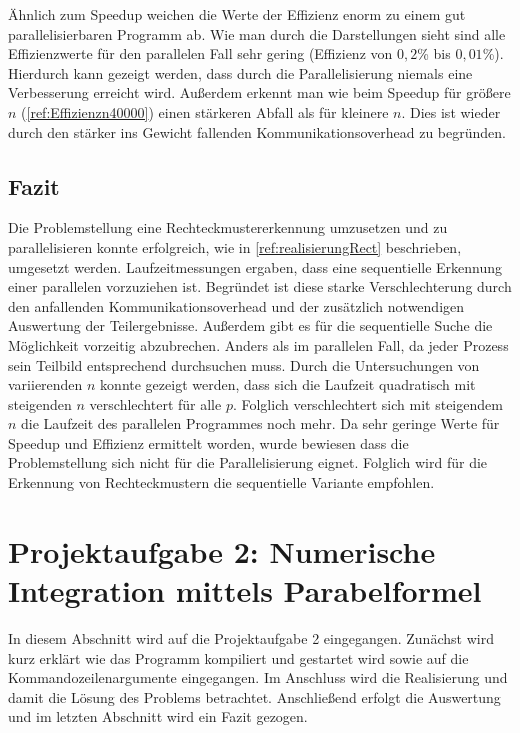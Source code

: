 Ähnlich zum Speedup weichen die Werte der Effizienz enorm zu einem gut parallelisierbaren Programm ab. 
Wie man durch die Darstellungen sieht sind alle Effizienzwerte für den parallelen Fall sehr gering (Effizienz von $0,2$\% bis $0,01$\%).
Hierdurch kann gezeigt werden, dass durch die Parallelisierung niemals eine Verbesserung erreicht wird. 
Außerdem erkennt man wie beim Speedup für größere $n$ (\autoref{ref:Effizienzn40000}) einen stärkeren Abfall als für kleinere $n$.
Dies ist wieder durch den stärker ins Gewicht fallenden Kommunikationsoverhead zu begründen.

\subsection{Fazit}
Die Problemstellung eine Rechteckmustererkennung umzusetzen und zu parallelisieren konnte erfolgreich, wie in \autoref{ref:realisierungRect} beschrieben, umgesetzt werden. 
Laufzeitmessungen ergaben, dass eine sequentielle Erkennung einer parallelen vorzuziehen ist.
Begründet ist diese starke Verschlechterung durch den anfallenden Kommunikationsoverhead und der zusätzlich notwendigen Auswertung der Teilergebnisse. 
Außerdem gibt es für die sequentielle Suche die Möglichkeit vorzeitig abzubrechen.
Anders als im parallelen Fall, da jeder Prozess sein Teilbild entsprechend durchsuchen muss.
Durch die Untersuchungen von variierenden $n$ konnte gezeigt werden, dass sich die Laufzeit quadratisch mit steigenden $n$ verschlechtert für alle $p$.
Folglich verschlechtert sich mit steigendem $n$ die Laufzeit des parallelen Programmes noch mehr.
Da sehr geringe Werte für Speedup und Effizienz ermittelt worden, wurde bewiesen dass die Problemstellung sich nicht für die Parallelisierung eignet.
Folglich wird für die Erkennung von Rechteckmustern die sequentielle Variante empfohlen.

\pagebreak
\section{Projektaufgabe 2: Numerische Integration mittels Parabelformel}
\lstset{language=Fortran,frame=none, keepspaces=false,tabsize=1,captionpos=b, basicstyle=\scriptsize,showstringspaces=false,breaklines=true}  
In diesem Abschnitt wird auf die Projektaufgabe 2 eingegangen.
Zunächst wird kurz erklärt wie das Programm kompiliert und gestartet wird sowie auf die Kommandozeilenargumente eingegangen.
Im Anschluss wird die Realisierung und damit die Lösung des Problems betrachtet.
Anschließend erfolgt die Auswertung und im letzten Abschnitt wird ein Fazit gezogen.

